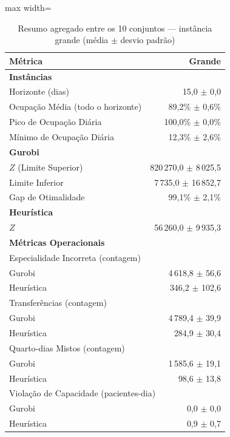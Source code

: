 \begin{table}[htbp]
    \caption{Resumo agregado entre os 10 conjuntos --- instância grande (média $\pm$ desvio padrão)}
    \label{tab:agregado-grande}
    \centering
    \begin{adjustbox}{max width=\textwidth}
    \begin{tabular}{lr}
        \hline
        \textbf{Métrica} & \textbf{Grande} \\
        \hline
        \multicolumn{2}{l}{\textbf{Instâncias}} \\
        Horizonte (dias) & 15,0 $\pm$ 0,0 \\
        Ocupação Média (todo o horizonte) & 89,2\% $\pm$ 0,6\% \\
        Pico de Ocupação Diária & 100,0\% $\pm$ 0,0\% \\
        Mínimo de Ocupação Diária & 12,3\% $\pm$ 2,6\% \\
        \hline
        \multicolumn{2}{l}{\textbf{Gurobi}} \\
        $Z$ (Limite Superior) & 820\,270,0 $\pm$ 8\,025,5 \\
        Limite Inferior & 7\,735,0 $\pm$ 16\,852,7 \\
        Gap de Otimalidade & 99,1\% $\pm$ 2,1\% \\
        \hline
        \multicolumn{2}{l}{\textbf{Heurística}} \\
        $Z$ & 56\,260,0 $\pm$ 9\,935,3 \\
        \hline
        \multicolumn{2}{l}{\textbf{Métricas Operacionais}} \\
        \multicolumn{2}{l}{Especialidade Incorreta (contagem)} \\
        \quad Gurobi & 4\,618,8 $\pm$ 56,6 \\
        \quad Heurística & 346,2 $\pm$ 102,6 \\
        \multicolumn{2}{l}{Transferências (contagem)} \\
        \quad Gurobi & 4\,789,4 $\pm$ 39,9 \\
        \quad Heurística & 284,9 $\pm$ 30,4 \\
        \multicolumn{2}{l}{Quarto-dias Mistos (contagem)} \\
        \quad Gurobi & 1\,585,6 $\pm$ 19,1 \\
        \quad Heurística & 98,6 $\pm$ 13,8 \\
        \multicolumn{2}{l}{Violação de Capacidade (pacientes-dia)} \\
        \quad Gurobi & 0,0 $\pm$ 0,0 \\
        \quad Heurística & 0,9 $\pm$ 0,7 \\
        \hline
    \end{tabular}
    \end{adjustbox}
\end{table}
